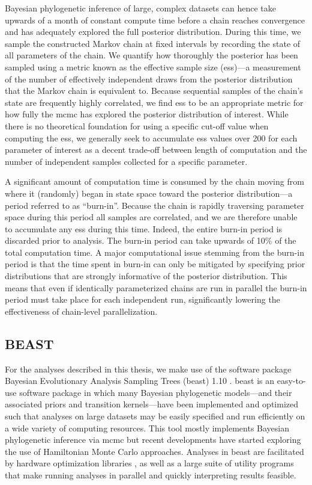 Bayesian phylogenetic inference of large, complex datasets can hence take upwards of a month of constant compute time before a chain reaches convergence and has adequately explored the full posterior distribution.
During this time, we sample the constructed Markov chain at fixed intervals by recording the state of all parameters of the chain.
We quantify how thoroughly the posterior has been sampled using a metric known as the effective sample size (\gls{ess})---a measurement of the number of effectively independent draws from the posterior distribution that the Markov chain is equivalent to.
Because sequential samples of the chain's state are frequently highly correlated, we find \gls{ess} to be an appropriate metric for how fully the \gls{mcmc} has explored the posterior distribution of interest.
While there is no theoretical foundation for using a specific cut-off value when computing the \gls{ess}, we generally seek to accumulate \gls{ess} values over 200 for each parameter of interest as a decent trade-off between length of computation and the number of independent samples collected for a specific parameter.

A significant amount of computation time is consumed by the chain moving from where it (randomly) began in state space toward the posterior distribution---a period referred to as ``burn-in''.
Because the chain is rapidly traversing parameter space during this period all samples are correlated, and we are therefore unable to accumulate any \gls{ess} during this time.
Indeed, the entire burn-in period is discarded prior to analysis.
The burn-in period can take upwards of 10\% of the total computation time.
A major computational issue stemming from the burn-in period is that the time spent in burn-in can only be mitigated by specifying prior distributions that are strongly informative of the posterior distribution.
This means that even if identically parameterized chains are run in parallel the burn-in period must take place for each independent run, significantly lowering the effectiveness of chain-level parallelization.

\subsection{BEAST}

For the analyses described in this thesis, we make use of the software package Bayesian Evolutionary Analysis Sampling Trees (\gls{beast}) 1.10 \cite{suchard2018bayesian}.
\gls{beast} is an easy-to-use software package in which many Bayesian phylogenetic models---and their associated priors and transition kernels---have been implemented and optimized such that analyses on large datasets may be easily specified and run efficiently on a wide variety of computing resources.
This tool mostly implements Bayesian phylogenetic inference via \gls{mcmc} but recent developments have started exploring the use of Hamiltonian Monte Carlo approaches.
Analyses in \gls{beast} are facilitated by hardware optimization libraries \cite{ayres2019beagle}, as well as a large suite of utility programs that make running analyses in parallel and quickly interpreting results feasible.

